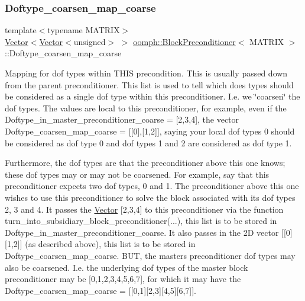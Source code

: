 \subsubsection{\texorpdfstring{Doftype\+\_\+coarsen\+\_\+map\+\_\+coarse}{Doftype\_coarsen\_map\_coarse}}
{\footnotesize\ttfamily template$<$typename M\+A\+T\+R\+IX$>$ \\
\hyperlink{classoomph_1_1Vector}{Vector}$<$\hyperlink{classoomph_1_1Vector}{Vector}$<$unsigned$>$ $>$ \hyperlink{classoomph_1_1BlockPreconditioner}{oomph\+::\+Block\+Preconditioner}$<$ M\+A\+T\+R\+IX $>$\+::Doftype\+\_\+coarsen\+\_\+map\+\_\+coarse\hspace{0.3cm}{\ttfamily [protected]}}



Mapping for dof types within T\+H\+IS precondition. This is usually passed down from the parent preconditioner. This list is used to tell which does types should be considered as a single dof type within this preconditioner. I.\+e. we \char`\"{}coarsen\char`\"{} the dof types. The values are local to this preconditioner, for example, even if the Doftype\+\_\+in\+\_\+master\+\_\+preconditioner\+\_\+coarse = \mbox{[}2,3,4\mbox{]}, the vector Doftype\+\_\+coarsen\+\_\+map\+\_\+coarse = \mbox{[}\mbox{[}0\mbox{]},\mbox{[}1,2\mbox{]}\mbox{]}, saying your local dof types 0 should be considered as dof type 0 and dof types 1 and 2 are considered as dof type 1. 

Furthermore, the dof types are that the preconditioner above this one knows; these dof types may or may not be coarsened. For example, say that this preconditioner expects two dof types, 0 and 1. The preconditioner above this one wishes to use this preconditioner to solve the block associated with it\textquotesingle{}s dof types 2, 3 and 4. It passes the \hyperlink{classoomph_1_1Vector}{Vector} \mbox{[}2,3,4\mbox{]} to this preconditioner via the function turn\+\_\+into\+\_\+subsidiary\+\_\+block\+\_\+preconditioner(...), this list is to be stored in Doftype\+\_\+in\+\_\+master\+\_\+preconditioner\+\_\+coarse. It also passes in the 2D vector \mbox{[}\mbox{[}0\mbox{]}\mbox{[}1,2\mbox{]}\mbox{]} (as described above), this list is to be stored in Doftype\+\_\+coarsen\+\_\+map\+\_\+coarse. B\+UT, the master\textquotesingle{}s preconditioner dof types may also be coarsened. I.\+e. the underlying dof types of the master block preconditioner may be \mbox{[}0,1,2,3,4,5,6,7\mbox{]}, for which it may have the Doftype\+\_\+coarsen\+\_\+map\+\_\+coarse = \mbox{[}\mbox{[}0,1\mbox{]}\mbox{[}2,3\mbox{]}\mbox{[}4,5\mbox{]}\mbox{[}6,7\mbox{]}\mbox{]}.

